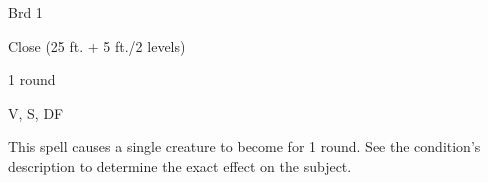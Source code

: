 
\begin{description*}
\item[Level:] Brd 1
\item[Range:] Close (25 ft. + 5 ft./2 levels)
\item[Duration:] 1 round
\item[Components:] V, S, DF
\end{description*}

This spell causes a single creature to become  for 1 round. See
the condition's description to determine the exact effect on the subject.